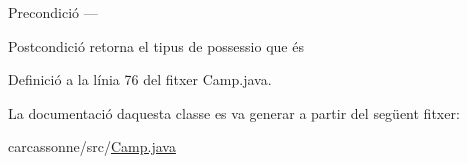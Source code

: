 \begin{DoxyPrecond}{Precondició}
--- 
\end{DoxyPrecond}
\begin{DoxyPostcond}{Postcondició}
retorna el tipus de possessio que és 
\end{DoxyPostcond}


Definició a la línia 76 del fitxer Camp.\+java.



La documentació d\textquotesingle{}aquesta classe es va generar a partir del següent fitxer\+:\begin{DoxyCompactItemize}
\item 
carcassonne/src/\mbox{\hyperlink{_camp_8java}{Camp.\+java}}\end{DoxyCompactItemize}
